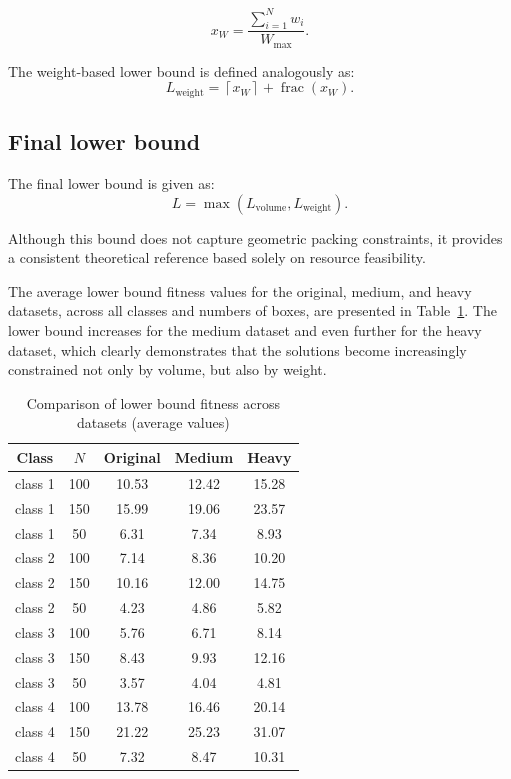 \[
x_W = \frac{\sum_{i=1}^{N} w_i}{W_{\max}}.
\]

The weight-based lower bound is defined analogously as:
\[
L_{\mathrm{weight}} = \left\lceil x_W \right\rceil + \operatorname{frac}(x_W).
\]

\subsection*{Final lower bound}

The final lower bound is given as:
\[
L = \max \left(L_{\mathrm{volume}}, L_{\mathrm{weight}}\right).
\]

Although this bound does not capture geometric packing constraints, it provides a consistent theoretical reference based solely on resource feasibility.

The average lower bound fitness values for the original, medium, and heavy datasets, 
across all classes and numbers of boxes, are presented in Table~\ref{tab:lower-bound}.
The lower bound increases for the medium dataset and even further for the heavy dataset, 
which clearly demonstrates that the solutions become increasingly constrained not only by volume, 
but also by weight.

\begin{table}[htbp]
\centering
\caption{Comparison of lower bound fitness across datasets (average values)}
\label{tab:lower-bound}
\begin{tabular}{|c|c|c|c|c|}
\hline
Class & $N$ & Original & Medium & Heavy \\ \hline
class 1 & 100 & 10.53 & 12.42 & 15.28 \\ \hline
class 1 & 150 & 15.99 & 19.06 & 23.57 \\ \hline
class 1 & 50  & 6.31  & 7.34  & 8.93  \\ \hline
class 2 & 100 & 7.14  & 8.36  & 10.20 \\ \hline
class 2 & 150 & 10.16 & 12.00 & 14.75 \\ \hline
class 2 & 50  & 4.23  & 4.86  & 5.82  \\ \hline
class 3 & 100 & 5.76  & 6.71  & 8.14  \\ \hline
class 3 & 150 & 8.43  & 9.93  & 12.16 \\ \hline
class 3 & 50  & 3.57  & 4.04  & 4.81  \\ \hline
class 4 & 100 & 13.78 & 16.46 & 20.14 \\ \hline
class 4 & 150 & 21.22 & 25.23 & 31.07 \\ \hline
class 4 & 50  & 7.32  & 8.47  & 10.31 \\ \hline
\end{tabular}
\end{table}

